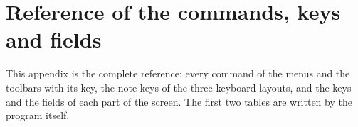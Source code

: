 \chapter{Reference of the commands, keys and fields}\label{app:reference}

This appendix is the complete reference: every command of the menus and the toolbars with its key, the note keys of the three keyboard
layouts, and the keys and the fields of each part of the screen. The first two tables are written by the program itself.


